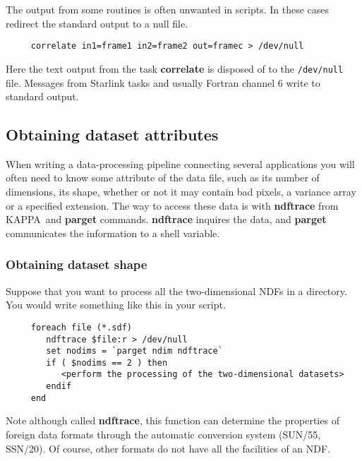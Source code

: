 \documentclass[twoside,11pt]{article}
\newcommand{\htmlref}[2]{#1}
\newcommand{\xref}[3]{#1}
\newcommand{\xlabel}[1]{}
\newcommand{\KAPPAref}{\xref{{\footnotesize KAPPA}}{sun95}{}}
\newcommand{\NDFref}[1]{\xref{#1}{sun33}{}}
\begin{document}
The output from some routines is often unwanted in scripts.  In these
cases redirect the \htmlref{{\sf standard output}}{sc4_gl_std_out} to a
null file.

\small
\begin{verbatim}
     correlate in1=frame1 in2=frame2 out=framec > /dev/null
\end{verbatim}
\normalsize
Here the text output from the task {\bf correlate} is disposed of to
the {\tt /dev/null} file.  Messages from Starlink tasks and usually
Fortran channel 6 write to {\sf standard output}.

\newpage
\subsection{\xlabel{sc4_se_dataset_attributes}Obtaining dataset
attributes\label{sc4_se_dataset_attributes}}

When writing a data-processing pipeline connecting several applications
you will often need to know some attribute of the data file, such as
its number of dimensions, its shape, whether or not it may contain bad
pixels, a variance array or a specified extension.  The way to 
access these data is with \xref{{\bf ndftrace}}{sun95}{NDFTRACE} from
\KAPPAref\ and \xref{{\bf parget}}{sun95}{PARGET} commands.
{\bf ndftrace} inquires the data, and {\bf parget} communicates the
information to a \htmlref{shell variable}{sc4_se_variables}.

\subsubsection{\xlabel{sc4_se_dataset_shape}Obtaining dataset shape
\label{sc4_se_dataset_shape}}

Suppose that you want to process all the two-dimensional \NDFref{{\sf
NDF}s} in a directory.  You would write something like this in your
script.

\small
\begin{verbatim}
     foreach file (*.sdf)
        ndftrace $file:r > /dev/null
        set nodims = `parget ndim ndftrace`
        if ( $nodims == 2 ) then
           <perform the processing of the two-dimensional datasets>
        endif
     end
\end{verbatim}
\normalsize

Note although called \xref{{\bf ndftrace}}{sun95}{NDFTRACE}, this
function can determine the properties of foreign data formats through
the automatic conversion system (\xref{SUN/55}{sun55}{}, 
\xref{SSN/20}{ssn20}{}).  Of course, other formats do not have all the
facilities of an NDF.
\end{document}
